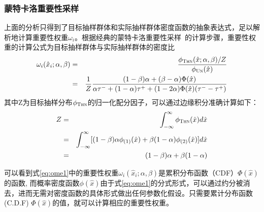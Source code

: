 \subsubsection{蒙特卡洛重要性采样}
上面的分析只得到了目标抽样群体和实际抽样群体密度函数的抽象表达式，足以解析地计算重要性权重$\omega_i$。根据经典的蒙特卡洛重要性采样~\cite{Hesterberg:1988,Bengio:2008:TNN}的计算步骤，重要性权重的计算公式为目标抽样群体与实际抽样群体的密度比
\begin{eqnarray}
	\omega_i(\hat x_i;\alpha, \beta)&=& \frac{\phi_\textsc{Thn}(\hat{x};\alpha, \beta)/Z}{\phi_{\textsc{Un}}(\hat{x})} \label{eq:ome} \\
	&=& \frac{1}{Z} \frac{(1-\beta)\alpha + (\beta-\alpha)\Phi(\hat{x})}{\alpha\tau^- + (1- \alpha)\tau^+  + (1-2\alpha)\Phi(\hat{x})(\tau^- -\tau^+)}  \label{eq:ome1}
\end{eqnarray}
其中Z为目标抽样分布$\phi_\textsc{Thn}$的归一化配分因子，可以通过边缘积分准确计算如下：
\begin{eqnarray}
	Z &=& \int_{ - \infty } ^{\infty} \phi_{\textsc{Thn}}(\hat{x})  d \hat{x} \nonumber \\
	&=& \int_{-\infty}^{\infty}  [(1-\beta)\alpha  \phi_{(1)}(\hat{x}) +\beta (1-\alpha)  \phi_{(2)}(\hat{x})]  d \hat{x} \nonumber \\
	&=& (1-\beta)\alpha + \beta (1-\alpha)
\end{eqnarray}

可以看到式\eqref{eq:ome1}中的重要性权重$\omega_i(\hat x_i;\alpha, \beta)$是累积分布函数（CDF）$\Phi (\hat{x})$的函数, 而概率密度函数$\phi{(\hat{x})}$由于式\eqref{eq:ome1}的分式形式，可以通过约分被消去，进而无需对密度函数的具体形式做出任何参数化假设。只需要累计分布函数(C.D.F)
$\Phi (\hat{x})$的值，就可以计算相应的重要性权重。


